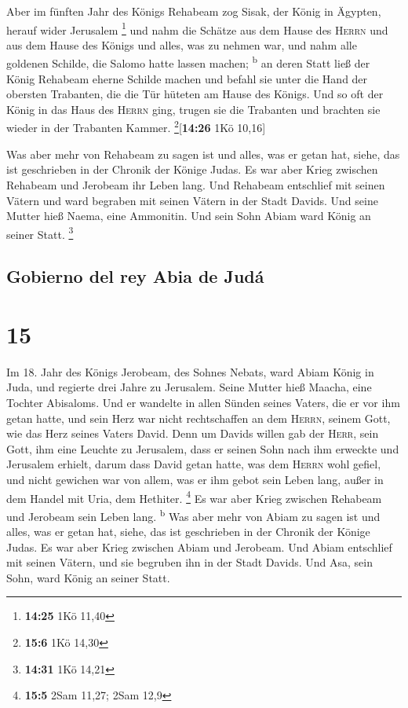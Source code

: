  Aber im fünften Jahr des Königs Rehabeam zog Sisak, der
König in Ägypten, herauf wider Jerusalem \footnote{\textbf{14:25} 1Kö
  11,40}  und nahm die Schätze aus dem Hause des
\textsc{Herrn} und aus dem Hause des Königs und alles, was zu nehmen
war, und nahm alle goldenen Schilde, die Salomo hatte lassen machen;
\textsuperscript{b}  an deren Statt ließ der König
Rehabeam eherne Schilde machen und befahl sie unter die Hand der
obersten Trabanten, die die Tür hüteten am Hause des Königs.
 Und so oft der König in das Haus des \textsc{Herrn}
ging, trugen sie die Trabanten und brachten sie wieder in der Trabanten
Kammer. \footnote{\textbf{15:6} 1Kö 14,30}{[}\textbf{14:26} 1Kö 10,16{]}

 Was aber mehr von Rehabeam zu sagen ist und alles, was
er getan hat, siehe, das ist geschrieben in der Chronik der Könige
Judas.  Es war aber Krieg zwischen Rehabeam und Jerobeam
ihr Leben lang.  Und Rehabeam entschlief mit seinen
Vätern und ward begraben mit seinen Vätern in der Stadt Davids. Und
seine Mutter hieß Naema, eine Ammonitin. Und sein Sohn Abiam ward König
an seiner Statt. \footnote{\textbf{14:31} 1Kö 14,21}

\hypertarget{gobierno-del-rey-abia-de-juduxe1}{%
\subsection{Gobierno del rey Abia de
Judá}\label{gobierno-del-rey-abia-de-juduxe1}}

\hypertarget{section-14}{%
\section{15}\label{section-14}}

 Im 18. Jahr des Königs Jerobeam, des Sohnes Nebats, ward
Abiam König in Juda,  und regierte drei Jahre zu
Jerusalem. Seine Mutter hieß Maacha, eine Tochter Abisaloms.
 Und er wandelte in allen Sünden seines Vaters, die er vor
ihm getan hatte, und sein Herz war nicht rechtschaffen an dem
\textsc{Herrn}, seinem Gott, wie das Herz seines Vaters David.
 Denn um Davids willen gab der \textsc{Herr}, sein Gott,
ihm eine Leuchte zu Jerusalem, dass er seinen Sohn nach ihm erweckte und
Jerusalem erhielt,  darum dass David getan hatte, was dem
\textsc{Herrn} wohl gefiel, und nicht gewichen war von allem, was er ihm
gebot sein Leben lang, außer in dem Handel mit Uria, dem Hethiter.
\footnote{\textbf{15:5} 2Sam 11,27; 2Sam 12,9}  Es war
aber Krieg zwischen Rehabeam und Jerobeam sein Leben lang.
\textsuperscript{b}  Was aber mehr von Abiam zu sagen ist
und alles, was er getan hat, siehe, das ist geschrieben in der Chronik
der Könige Judas. Es war aber Krieg zwischen Abiam und Jerobeam.
 Und Abiam entschlief mit seinen Vätern, und sie begruben
ihn in der Stadt Davids. Und Asa, sein Sohn, ward König an seiner Statt.

